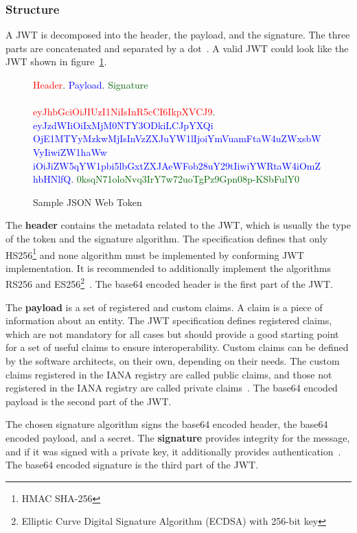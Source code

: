 \subsubsection{Structure}
A JWT is decomposed into the header, the payload, and the signature.
The three parts are concatenated and separated by a dot~\cite{jwtdocauth0}.
A valid JWT could look like the JWT shown in figure~\ref{fig:myjwt}.
\begin{figure}
    \textcolor{red}{Header}.
	\textcolor{blue}{Payload}.
	\textcolor{darkgreen}{Signature} \\ \\
    \textcolor{red}{eyJhbGciOiJIUzI1NiIsInR5cCI6IkpXVCJ9}.
	\textcolor{blue}{eyJzdWIiOiIxMjM0NTY3ODkiLCJpYXQi\\OjE1MTYyMzkwMjIsInVzZXJuYW1lIjoiYmVuamFtaW4uZWxsbWVyIiwiZW1haWw\\iOiJiZW5qYW1pbi5lbGxtZXJAeWFob28uY29tIiwiYWRtaW4iOmZhbHNlfQ}.
	\textcolor{darkgreen}{0ksqN71oloNvq3IrY7w72uoTgPz9Gpn08p-KSbFulY0}
    \caption{Sample JSON Web Token}
    \label{fig:myjwt}
\end{figure}

The \textbf{header} contains the metadata related to the JWT, which is usually the type of the token and the signature algorithm.
The specification defines that only HS256\footnote{HMAC SHA-256} and none algorithm must be implemented  by conforming JWT implementation.
It is recommended to additionally implement the algorithms RS256 and ES256\footnote{Elliptic Curve Digital Signature Algorithm (ECDSA) with 256-bit key}~\cite{jwtdocauth0, jwtrfc}.
The base64 encoded header is the first part of the JWT.

The \textbf{payload} is a set of registered and custom claims.
A claim is a piece of information about an entity.
The JWT specification defines registered claims, which are not mandatory for all cases but should provide a good starting point for a set of useful claims to ensure interoperability.
Custom claims can be defined by the software architects, on their own, depending on their needs.
The custom claims registered in the IANA registry are called public claims, and those not registered in the IANA registry are called private claims~\cite{jwtdocauth0, jwtrfc}.
The base64 encoded payload is the second part of the JWT.

The chosen signature algorithm signs the base64 encoded header, the base64 encoded payload, and a secret.
The \textbf{signature} provides integrity for the message, and if it was signed with a private key, it additionally provides authentication~\cite{jwtdocauth0}.
The base64 encoded signature is the third part of the JWT.

